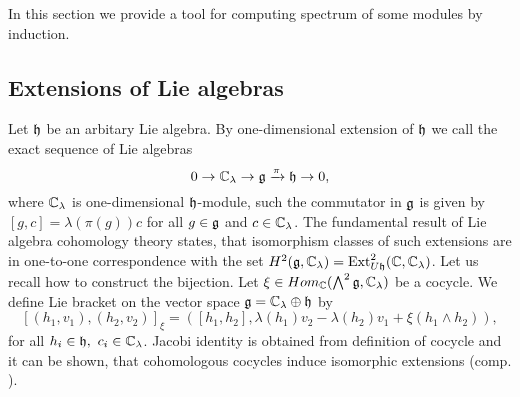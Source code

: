 In this section we provide a tool for computing spectrum of some modules by induction.

\subsection{Extensions of Lie algebras}
Let $\mathfrak{h}$ be an arbitary Lie algebra. By one-dimensional extension of $\mathfrak{h}$ we call the exact
sequence of Lie algebras
\[
    0 \to \mathbb{C}_\lambda\rightarrow \mathfrak{g} \xrightarrow\pi \mathfrak{h} \to 0,
\]
where $\mathbb{C}_\lambda$ is one-dimensional $\mathfrak{h}$-module, such the commutator in $\mathfrak{g}$ is given by
$[g,c] = \lambda(\pi(g))c$ for all $g \in \mathfrak{g}$ and $c \in \mathbb{C}_\lambda$.  The fundamental result of
Lie algebra cohomology theory states, that isomorphism classes of such extensions are in one-to-one
correspondence with the set $H^2(\mathfrak{g},\mathbb{C}_\lambda) = \operatorname{Ext}^2_{U\mathfrak{h}}(\mathbb{C}, \mathbb{C}_\lambda)$. Let
us recall how to construct the bijection. Let $\xi \in Hom_{\mathbb{C}}(\bigwedge^2\mathfrak{g}, \mathbb{C}_\lambda)$ be a
cocycle. We define Lie bracket on the vector space $\mathfrak{g} = \mathbb{C}_\lambda \oplus \mathfrak{h}$ by 
\[
    [(h_1, v_1), (h_2, v_2)]_\xi= ([h_1, h_2], \lambda(h_1) v_2 - \lambda(h_2) v_1 +
    \xi(h_1\wedge h_2)), 
\]
for all $h_i \in \mathfrak{h},~c_i\in \mathbb{C}_\lambda$. Jacobi identity is obtained from definition of cocycle
and it can be shown, that cohomologous cocycles induce isomorphic extensions (comp. ).

